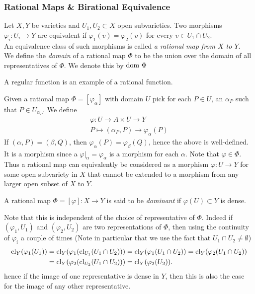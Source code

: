     \subsubsection{Rational Maps \& Birational Equivalence}
    \begin{definition}
        Let $X,Y$ be varieties and $U_1,U_2\subset X$ open subvarieties. Two morphisms $\varphi_i : U_i\rightarrow Y$ are equivalent if $\varphi_1(v)=\varphi_2(v)$ for every $v\in U_1\cap U_2$.\\
        An equivalence class of such morphisms is called \textit{a rational map from $X$ to $Y$}.\\
        We define the \textit{domain} of a rational map $\Phi$ to be the union over the domain of all representatives of $\Phi$. We denote this by $\mathrm{dom} \ \Phi$
    \end{definition}
    \begin{example}
        A regular function is an example of a rational function. 
    \end{example}
    \begin{remark}
        Given a rational map $\Phi=[\varphi_\alpha]$ with domain $U$ pick for each $P\in U$, an $\alpha_P$ such that $P\in U_{\alpha_P}$. We define 
        \begin{gather*}
            \varphi: U \rightarrow A\times U\rightarrow Y\\
            P \mapsto (\alpha_P,P)\rightarrow \varphi_\alpha(P)
        \end{gather*}
        If $(\alpha,P)=(\beta,Q)$, then $\varphi_\alpha(P)=\varphi_\beta(Q)$, hence the above is well-defined. It is a morphism since a $\left.\varphi\right|_\alpha = \varphi_\alpha$ is a morphism for each $\alpha$. Note that $\varphi \in \Phi$. Thus a rational map can equivalently be considered as a morphism $\varphi: U \rightarrow Y$ for some open subvariety in $X$ that cannot be extended to a morphism from any larger open subset of $X$ to $Y$.
    \end{remark}
    \begin{definition}
        A rational map $\Phi=[\varphi]: X \rightarrow Y$ is said to be \textit{dominant} if $\varphi(U)\subset Y$ is dense. 
    \end{definition}
    \begin{remark}
        Note that this is independent of the choice of representative of $\Phi$. Indeed if $(\varphi_1,U_1)$ and $(\varphi_2,U_2)$ are two representations of $\Phi$, then using the continuity of $\varphi_i$ a couple of times (Note in particular that we use the fact that $U_1\cap U_2\neq \emptyset$)
        \begin{align*}
            \mathrm{cl}_Y(\varphi_1(U_1))&=\mathrm{cl}_Y(\varphi_1(\mathrm{cl}_{U_1}(U_1\cap U_2))) = \mathrm{cl}_Y(\varphi_1(U_1\cap U_2))=\mathrm{cl}_Y(\varphi_2(U_1\cap U_2))\\ 
            &= \mathrm{cl}_Y(\varphi_2(\mathrm{cl}_{U_2}(U_1\cap U_2)))= \mathrm{cl}_Y(\varphi_2(U_2)).
        \end{align*}
        hence if the image of one representative is dense in $Y$, then this is also the case for the image of any other representative. 
    \end{remark}
